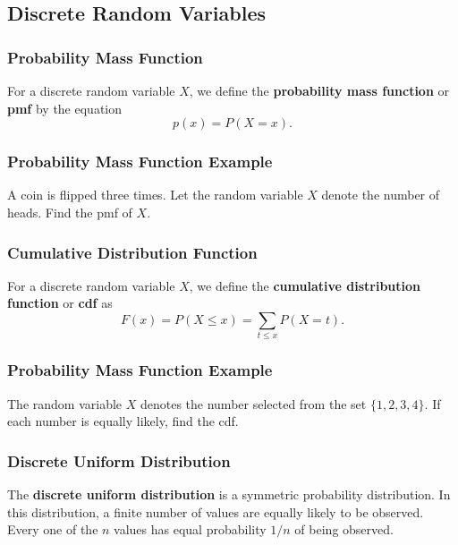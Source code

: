 \documentclass{beamer}
\begin{document}
\subsection{Discrete Random Variables}

\begin{frame}
\frametitle{Probability Mass Function}
\begin{Definition}
For a discrete random variable $X$, we define the {\bf probability mass function} or {\bf pmf} by the equation
$$
p(x) = P(X = x).
$$
\end{Definition}
\end{frame}

\begin{frame}[t]
\frametitle{Probability Mass Function Example}
\begin{Example}
A coin is flipped three times. Let the random variable $X$ denote the number of heads. Find the pmf of $X$.
\end{Example}

\end{frame}

\begin{frame}
\frametitle{Cumulative Distribution Function}
\begin{Definition}
For a discrete random variable $X$, we define the {\bf cumulative distribution function} or {\bf cdf} as
$$
F(x) = P(X\leq x) = \sum_{t \leq x} P(X = t).
$$
\end{Definition}
\end{frame}

\begin{frame}[t]
\frametitle{Probability Mass Function Example}
\begin{Example}
The random variable $X$ denotes the number selected from the set $\{1, 2, 3, 4\}$. If each number is equally likely, find the cdf.
\end{Example}

\end{frame}

\begin{frame}
\frametitle{Discrete Uniform Distribution}
\begin{Definition}
The {\bf discrete uniform distribution} is a symmetric probability distribution. In this distribution, a finite number of values are equally likely to be observed. Every one of the $n$ values has equal probability $1/n$ of being observed.
\end{Definition}
\end{frame}
\end{document}
